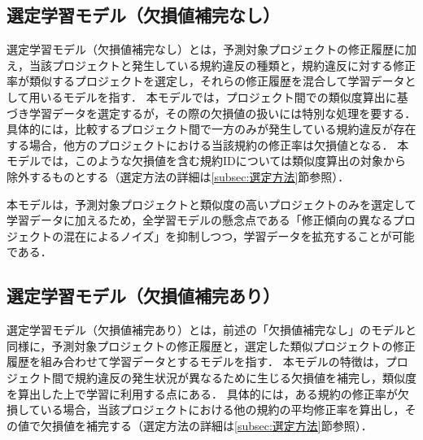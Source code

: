 \documentclass[11pt]{jreport}
\begin{document}
\subsection{選定学習モデル（欠損値補完なし）}


選定学習モデル（欠損値補完なし）とは，予測対象プロジェクトの修正履歴に加え，当該プロジェクトと発生している規約違反の種類と，規約違反に対する修正率が類似するプロジェクトを選定し，それらの修正履歴を混合して学習データとして用いるモデルを指す．
本モデルでは，プロジェクト間での類似度算出に基づき学習データを選定するが，その際の欠損値の扱いには特別な処理を要する．
具体的には，比較するプロジェクト間で一方のみが発生している規約違反が存在する場合，他方のプロジェクトにおける当該規約の修正率は欠損値となる．
本モデルでは，このような欠損値を含む規約IDについては類似度算出の対象から除外するものとする（選定方法の詳細は\ref{subsec:選定方法}節参照）．

本モデルは，予測対象プロジェクトと類似度の高いプロジェクトのみを選定して学習データに加えるため，全学習モデルの懸念点である「修正傾向の異なるプロジェクトの混在によるノイズ」を抑制しつつ，学習データを拡充することが可能である．

\subsection{選定学習モデル（欠損値補完あり）}


選定学習モデル（欠損値補完あり）とは，前述の「欠損値補完なし」のモデルと同様に，予測対象プロジェクトの修正履歴と，選定した類似プロジェクトの修正履歴を組み合わせて学習データとするモデルを指す．
本モデルの特徴は，プロジェクト間で規約違反の発生状況が異なるために生じる欠損値を補完し，類似度を算出した上で学習に利用する点にある．
具体的には，ある規約の修正率が欠損している場合，当該プロジェクトにおける他の規約の平均修正率を算出し，その値で欠損値を補完する（選定方法の詳細は\ref{subsec:選定方法}節参照）．
\end{document}
